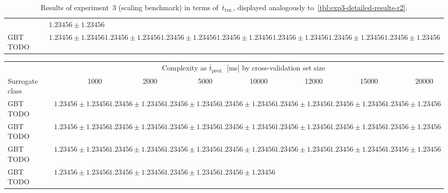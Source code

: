 \begin{table}[h]
{\begin{tabular}{lrrrrrrrr}
						& $\num{1.23456} \pm \num{1.23456}$
		\\
		GBT TODO
						& $\num{1.23456} \pm \num{1.23456}$
						& $\num{1.23456} \pm \num{1.23456}$
						& $\num{1.23456} \pm \num{1.23456}$
						& $\num{1.23456} \pm \num{1.23456}$
						& $\num{1.23456} \pm \num{1.23456}$
						& $\num{1.23456} \pm \num{1.23456}$
						& $\num{1.23456} \pm \num{1.23456}$
		\\
		\bottomrule
		\end{tabular}
	}
	\caption{Results of experiment~3 (scaling benchmark) in terms of~$\overline{t}_{\text{trn.}}$,
	displayed analogously to~\cref{tbl:exp3-detailed-results-r2}.}
	\label{tbl:exp3-detailed-results-t-train}
\end{table}


\begin{table}[h]
	\centering
	{\footnotesize
		\begin{tabular}{lrrrrrrrr}
		\toprule
		{} & \multicolumn{7}{c}{Complexity as $\overline{t}_{\text{pred.}}$~[ms] by cross-validation set size}\\
		\cmidrule(lr){2-8}
		Surrogate class
						& \num{1000}
						& \num{2000}
						& \num{5000}
						& \num{10000}
						& \num{12000}
						& \num{15000}
						& \num{20000}\\
		\midrule
		GBT TODO
						& $\num{1.23456} \pm \num{1.23456}$
						& $\num{1.23456} \pm \num{1.23456}$
						& $\num{1.23456} \pm \num{1.23456}$
						& $\num{1.23456} \pm \num{1.23456}$
						& $\num{1.23456} \pm \num{1.23456}$
						& $\num{1.23456} \pm \num{1.23456}$
						& $\num{1.23456} \pm \num{1.23456}$
		\\
		GBT TODO
						& $\num{1.23456} \pm \num{1.23456}$
						& $\num{1.23456} \pm \num{1.23456}$
						& $\num{1.23456} \pm \num{1.23456}$
						& $\num{1.23456} \pm \num{1.23456}$
						& $\num{1.23456} \pm \num{1.23456}$
						& $\num{1.23456} \pm \num{1.23456}$
						& $\num{1.23456} \pm \num{1.23456}$
		\\
		GBT TODO
						& $\num{1.23456} \pm \num{1.23456}$
						& $\num{1.23456} \pm \num{1.23456}$
						& $\num{1.23456} \pm \num{1.23456}$
						& $\num{1.23456} \pm \num{1.23456}$
						& $\num{1.23456} \pm \num{1.23456}$
						& $\num{1.23456} \pm \num{1.23456}$
						& $\num{1.23456} \pm \num{1.23456}$
		\\
		GBT TODO
						& $\num{1.23456} \pm \num{1.23456}$
						& $\num{1.23456} \pm \num{1.23456}$
						& $\num{1.23456} \pm \num{1.23456}$
						& $\num{1.23456} \pm \num{1.23456}$

\end{tabular}}
\end{table}
